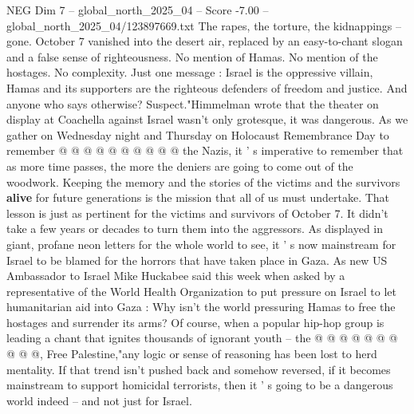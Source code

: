 \begin{textsample}{NEG Dim 7 – global\_north\_2025\_04 – Score -7.00 – global\_north\_2025\_04/123897669.txt}
The rapes, the torture, the kidnappings -- gone.
October 7 vanished into the desert air, replaced by an easy-to-chant slogan and a false sense of righteousness.
No mention of Hamas.
No mention of the hostages.
No complexity.
Just one message : Israel is the oppressive villain, Hamas and its supporters are the righteous defenders of freedom and justice.
And anyone who says otherwise?
Suspect."Himmelman wrote that the theater on display at Coachella against Israel wasn't only grotesque, it was dangerous.
As we gather on Wednesday night and Thursday on Holocaust Remembrance Day to remember @ @ @ @ @ @ @ @ @ @ the Nazis, it ' s imperative to remember that as more time passes, the more the deniers are going to come out of the woodwork.
Keeping the memory and the stories of the victims and the survivors \textbf{alive} for future generations is the mission that all of us must undertake.
That lesson is just as pertinent for the victims and survivors of October 7.
It didn't take a few years or decades to turn them into the aggressors.
As displayed in giant, profane neon letters for the whole world to see, it ' s now mainstream for Israel to be blamed for the horrors that have taken place in Gaza.
As new US Ambassador to Israel Mike Huckabee said this week when asked by a representative of the World Health Organization to put pressure on Israel to let humanitarian aid into Gaza : Why isn't the world pressuring Hamas to free the hostages and surrender its arms?
Of course, when a popular hip-hop group is leading a chant that ignites thousands of ignorant youth -- the @ @ @ @ @ @ @ @ @ @, Free Palestine,"any logic or sense of reasoning has been lost to herd mentality.
If that trend isn't pushed back and somehow reversed, if it becomes mainstream to support homicidal terrorists, then it ' s going to be a dangerous world indeed -- and not just for Israel.

\end{textsample}
